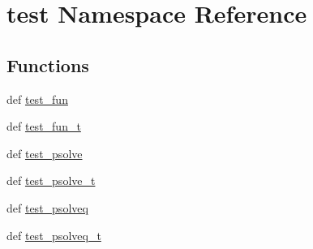 \hypertarget{namespacetest}{}\section{test Namespace Reference}
\label{namespacetest}
\subsection*{Functions}
\begin{DoxyCompactItemize}
\item 
def \hyperlink{namespacetest_ad4d6e3be622f358cce39cc22ba1e7bfb}{test\+\_\+fun}
\item 
def \hyperlink{namespacetest_a16eeec31c11f0bd88e6e0d8b1d5a188c}{test\+\_\+fun\+\_\+t}
\item 
def \hyperlink{namespacetest_a0f0383a76aa4c59bae2fa5d6aafadf3d}{test\+\_\+psolve}
\item 
def \hyperlink{namespacetest_a15a41e6873970cbc3315820370310580}{test\+\_\+psolve\+\_\+t}
\item 
def \hyperlink{namespacetest_ab6e86066fa873ee3c154fa2394282875}{test\+\_\+psolveq}
\item 
def \hyperlink{namespacetest_a96b22162e2f7232b223167ec3a9f66a6}{test\+\_\+psolveq\+\_\+t}
\end{DoxyCompactItemize}
